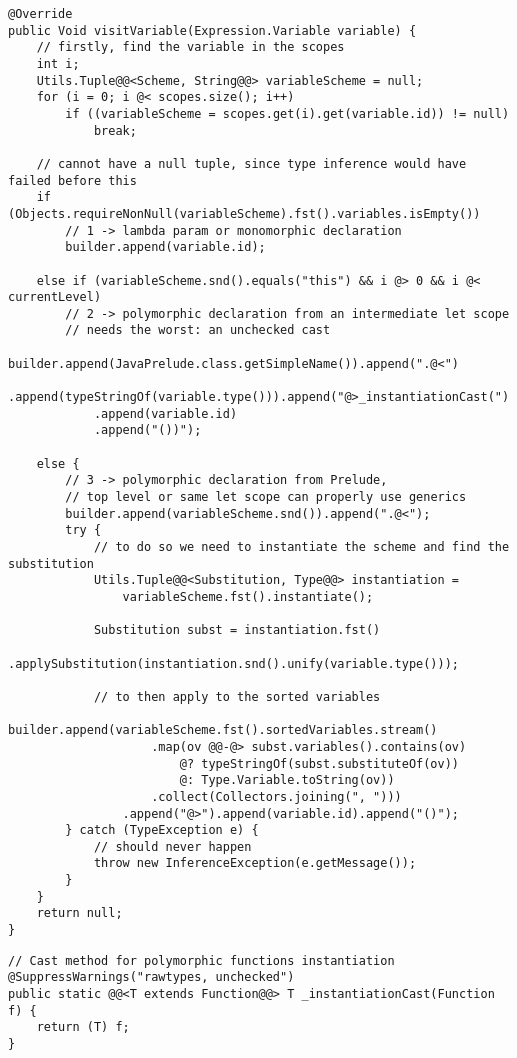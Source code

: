 \begin{lstlisting}[caption={Metodo \texttt{visit} per le variabili}, style=javaCode, label={lst:5-14-visit-variable-java}]
@Override
public Void visitVariable(Expression.Variable variable) {
    // firstly, find the variable in the scopes
    int i;
    Utils.Tuple@@<Scheme, String@@> variableScheme = null;
    for (i = 0; i @< scopes.size(); i++)
        if ((variableScheme = scopes.get(i).get(variable.id)) != null)
            break;

    // cannot have a null tuple, since type inference would have failed before this
    if (Objects.requireNonNull(variableScheme).fst().variables.isEmpty())
        // 1 -> lambda param or monomorphic declaration
        builder.append(variable.id);

    else if (variableScheme.snd().equals("this") && i @> 0 && i @< currentLevel)
        // 2 -> polymorphic declaration from an intermediate let scope 
        // needs the worst: an unchecked cast
        builder.append(JavaPrelude.class.getSimpleName()).append(".@<")
            .append(typeStringOf(variable.type())).append("@>_instantiationCast(")
            .append(variable.id)
            .append("())");

    else {
        // 3 -> polymorphic declaration from Prelude,
        // top level or same let scope can properly use generics
        builder.append(variableScheme.snd()).append(".@<");
        try {
            // to do so we need to instantiate the scheme and find the substitution
            Utils.Tuple@@<Substitution, Type@@> instantiation =
                variableScheme.fst().instantiate();

            Substitution subst = instantiation.fst()
                .applySubstitution(instantiation.snd().unify(variable.type()));

            // to then apply to the sorted variables
            builder.append(variableScheme.fst().sortedVariables.stream()
                    .map(ov @@-@> subst.variables().contains(ov)
                        @? typeStringOf(subst.substituteOf(ov))
                        @: Type.Variable.toString(ov))
                    .collect(Collectors.joining(", ")))
                .append("@>").append(variable.id).append("()");
        } catch (TypeException e) {
            // should never happen
            throw new InferenceException(e.getMessage());
        }
    }
    return null;
}
\end{lstlisting}
\vspace{4mm}
\begin{lstlisting}[caption={Metodo di istanziazione con \textit{cast}}, style=javaCode, label={lst:5-14-instantiation-cast-java}]
// Cast method for polymorphic functions instantiation
@SuppressWarnings("rawtypes, unchecked")
public static @@<T extends Function@@> T _instantiationCast(Function f) {
    return (T) f;
}
\end{lstlisting}

